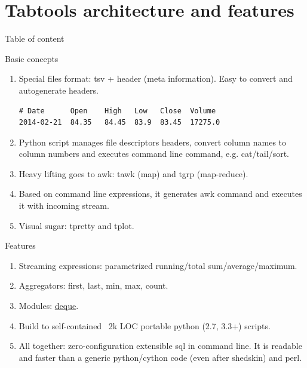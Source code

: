\documentclass[unicode, notheorems, aspectratio=169]{beamer}
\begin{document}
\section{Tabtools architecture and features}
\begin{frame}{Table of content}
	\tableofcontents[currentsection]
\end{frame}

\begin{frame}[fragile]{Basic concepts}
\begin{enumerate}
\item Special files format: tsv + header (meta information). Easy to convert and autogenerate headers.
\begin{verbatim}
# Date      Open    High   Low   Close  Volume
2014-02-21  84.35   84.45  83.9  83.45  17275.0
\end{verbatim}
\item Python script manages file descriptors headers, convert column names to column numbers and executes command line command, e.g. cat/tail/sort.
\item Heavy lifting goes to awk: tawk (map) and tgrp (map-reduce).
\item Based on command line expressions, it generates awk command and executes it with incoming stream.
\item Visual sugar: tpretty and tplot.
\end{enumerate}
\end{frame}

\begin{frame}{Features}
\begin{enumerate}
\item Streaming expressions: parametrized running/total sum/average/maximum\footnotemark.
\item Aggregators: first, last, min, max, count.
\item Modules: \href{https://en.wikipedia.org/wiki/Double-ended_queue}{deque}.
\item Build to self-contained ~2k LOC portable python (2.7, 3.3+) scripts.
\item All together: zero-configuration extensible sql in command line. It is readable and faster than a generic python/cython code (even after shedskin) and perl. 
\end{enumerate}

\end{frame}
\end{document}
